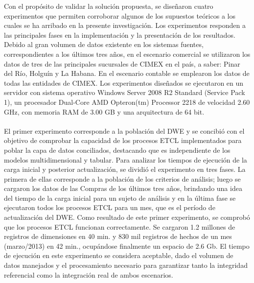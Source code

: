 \documentclass[preprint,12pt]{elsarticle}
\begin{document}
Con  el  propósito  de  validar  la  solución  propuesta,  se  diseñaron  cuatro  experimentos  que  permiten corroborar algunos de los supuestos teóricos a los cuales se ha arribado en la presente investigación. Los experimentos responden a las principales fases en la implementación y la presentación de los resultados. Debido al  gran volumen de datos existente en los sistemas  fuentes, correspondientes a  los últimos  tres años, en el escenario comercial se utilizaron los datos de tres de las principales sucursales de CIMEX en el país, a saber: Pinar del Río, Holguín y La Habana. En el escenario contable se emplearon los datos de todas las entidades de CIMEX.  Los experimentos  diseñados se  ejecutaron en  un servidor  con sistema operativo  Windows  Server  2008  R2  Standard  (Service  Pack  1),  un  procesador  Dual-Core  AMD Opteron(tm) Processor 2218 de velocidad 2.60 GHz, con memoria RAM de 3.00 GB y una arquitectura de 64 bit.  \\
\\
El primer experimento corresponde a la población del DWE y se concibió con el objetivo de comprobar la capacidad de los procesos ETCL implementados para poblar la capa de datos conciliados, destacando que es independiente de los modelos multidimensional y tabular. Para analizar los tiempos de ejecución de la carga  inicial  y  posterior  actualización,  se  dividió  el  experimento  en  tres  fases.  La  primera  de  ellas corresponde a la población de los criterios de análisis; luego se cargaron los datos de las Compras de los últimos tres  años, brindando una idea  del tiempo de  la carga inicial para  un sujeto de análisis y en  la última fase se ejecutaron todos los procesos ETCL para  un mes, que es el período de actualización del DWE.  Como  resultado de  este  primer experimento,  se  comprobó  que  los procesos  ETCL  funcionan correctamente. Se cargaron 1.2 millones de registros de dimensiones en 40 min. y 830 mil registros de hechos de un mes (marzo/2013) en 42 min., ocupándose finalmente un espacio de 2.6 Gb. El tiempo de ejecución  en  este  experimento  se  considera  aceptable,  dado  el  volumen  de  datos  manejados  y  el procesamiento necesario para garantizar tanto la integridad referencial como la integración real de ambos escenarios.  \\ 
\\
\end{document}
